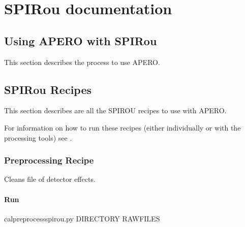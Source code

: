 \documentclass[a4paper,10pt,english]{report}
\begin{document}
\section{SPIRou documentation}
\label{\detokenize{user/spirou:spirou-documentation}}\label{\detokenize{user/spirou:spirou-main}}\label{\detokenize{user/spirou::doc}}

\subsection{Using APERO with SPIRou}
\label{\detokenize{user/spirou/using_apero_spirou:using-apero-with-spirou}}\label{\detokenize{user/spirou/using_apero_spirou:using-apero-spirou}}\label{\detokenize{user/spirou/using_apero_spirou::doc}}
This section describes the process to use APERO.


\subsection{SPIRou Recipes}
\label{\detokenize{user/spirou/recipes_spirou:spirou-recipes}}\label{\detokenize{user/spirou/recipes_spirou:recipes-spirou}}\label{\detokenize{user/spirou/recipes_spirou::doc}}
This section describes are all the SPIROU recipes to use with APERO.

For information on how to run these recipes (either individually or with the
processing tools) see {\hyperref[\detokenize{user/general/using_apero_default:using-apero-default}]{}}.


\subsubsection{Preprocessing Recipe}
\label{\detokenize{user/spirou/recipes/preprocessing:preprocessing-recipe}}\label{\detokenize{user/spirou/recipes/preprocessing:recipes-spirou-preprocessing}}\label{\detokenize{user/spirou/recipes/preprocessing::doc}}
Cleans file of detector effects.


\paragraph{Run}
\label{\detokenize{user/spirou/recipes/preprocessing:run}}
\begin{sphinxVerbatim}[commandchars=\\\{\}]
cal\PYGZus{}preprocess\PYGZus{}spirou.py \PYG{o}{[}DIRECTORY\PYG{o}{]} \PYG{o}{[}RAW\PYGZus{}FILES\PYG{o}{]}
\end{sphinxVerbatim}
\end{document}
